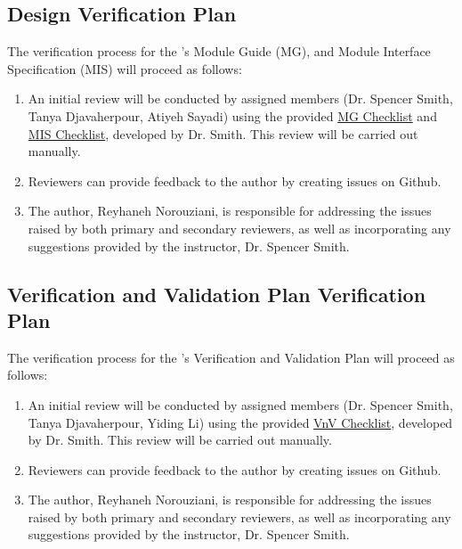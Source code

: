 \documentclass[12pt, titlepage]{article}
\begin{document}
\subsection{Design Verification Plan}

The verification process for the \progname{}'s Module Guide (MG), and Module Interface Specification (MIS) will proceed as follows:
\begin{enumerate}
    \item An initial review will be conducted by assigned members (Dr. Spencer Smith, Tanya Djavaherpour, Atiyeh Sayadi) using the provided \href{https://github.com/smiths/capTemplate/blob/9251702fdcb9800c59f6ed3d11d91e2bd62fca6d/docs/Checklists/MG-Checklist.pdf}{MG Checklist} and \href{https://github.com/smiths/capTemplate/blob/9251702fdcb9800c59f6ed3d11d91e2bd62fca6d/docs/Checklists/MIS-Checklist.pdf}{MIS Checklist}, developed by Dr. Smith. This review will be carried out manually.
    \item Reviewers can provide feedback to the author by creating issues on Github.
    \item The author, Reyhaneh Norouziani, is responsible for addressing the issues raised by both primary and secondary reviewers, as well as incorporating any suggestions provided by the instructor, Dr. Spencer Smith.
\end{enumerate}


\subsection{Verification and Validation Plan Verification Plan}

The verification process for the \progname{}'s Verification and Validation Plan will proceed as follows:
\begin{enumerate}
    \item An initial review will be conducted by assigned members (Dr. Spencer Smith, Tanya Djavaherpour, Yiding Li) using the provided \href{https://github.com/smiths/capTemplate/blob/9251702fdcb9800c59f6ed3d11d91e2bd62fca6d/docs/Checklists/VnV-Checklist.pdf}{VnV Checklist}, developed by Dr. Smith. This review will be carried out manually.
    \item Reviewers can provide feedback to the author by creating issues on Github.
    \item The author, Reyhaneh Norouziani, is responsible for addressing the issues raised by both primary and secondary reviewers, as well as incorporating any suggestions provided by the instructor, Dr. Spencer Smith.
\end{enumerate}
\end{document}
